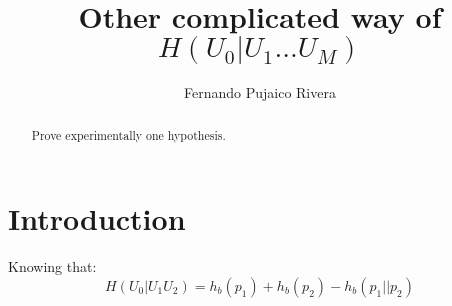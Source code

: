 \documentclass[a4paper,10pt]{article}
\title{Other complicated way of $H(U_0|U_1 ... U_M)$}
\author{Fernando Pujaico Rivera}
\begin{document}
\maketitle
\begin{abstract}
Prove experimentally one hypothesis.
\end{abstract}

\section{Introduction}

Knowing that:
\begin{equation}
H(U_0|U_1 U_2) = h_b(p_1) + h_b(p_2) - h_b(p_1||p_2)
\end{equation}
\end{document}
